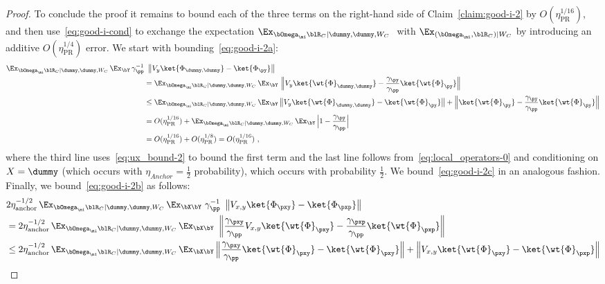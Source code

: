 \begin{proof}
	To conclude the proof  it remains to bound each of the three terms on the right-hand side of Claim~\ref{claim:good-i-2} by $O(\eta_{\text{PR}}^{1/16})$, and then use~\eqref{eq:good-i-cond} to exchange the expectation $ 	\Ex_{\bOmega_{\mi} \blR_C | \dummy,\dummy,W_C} \,\, $ with $ \Ex_{(\bOmega_{\mi}, \blR_C) | W_C}$ by introducing an additive $O(\eta_{\text{PR}}^{1/4})$ error. 
	We start with bounding~\eqref{eq:good-i-2a}:
	\begin{align*}
	\Ex_{\bOmega_{\mi} \blR_C | \dummy,\dummy,W_C} \, \Ex_{\bY} \, \gamma_\pp^{-1} &\,\, \left \|  V_y \ket{{\Phi}_{\dummy,\dummy}} -  \ket{{\Phi}_\py} \right \|  \\
		&=\Ex_{\bOmega_{\mi} \blR_C | \dummy,\dummy,W_C} \, \Ex_{\bY} \,\, \Big \|  V_y \ket{\wt{\Phi}_{\dummy,\dummy}} -  \frac{\gamma_\py}{\gamma_\pp} \ket{\wt{\Phi}_\py} \Big \| \\
		&\leq  \Ex_{\bOmega_{\mi} \blR_C | \dummy,\dummy,W_C} \, \Ex_{\bY} \, \big \|  V_y \ket{\wt{\Phi}_{\dummy,\dummy}} - \ket{\wt{\Phi}_{\py}} \big \| + \Big \| \ket{\wt{\Phi}_{\py}} - \frac{\gamma_{\py}}{\gamma_\pp} \ket{\wt{\Phi}_{\py}}\Big \|\\
		&= O(\eta_{\text{PR}}^{1/16}) + \Ex_{\bOmega_{\mi} \blR_C | \dummy,\dummy,W_C} \, \Ex_{\bY} \, \Big | 1 - \frac{\gamma_{\py}}{\gamma_\pp} \Big | \\
		&= O(\eta_{\text{PR}}^{1/16}) + O(\eta_{\text{PR}}^{1/8}) = O(\eta_{\text{PR}}^{1/16})~,
	\end{align*}
	where the third line uses~\eqref{eq:ux_bound-2} to bound the first term and the last line follows from~\eqref{eq:local_operators-0} and conditioning on $X = \dummy$ (which occurs with $\eta_{Anchor} = \frac{1}{2}$ probability), which occurs with probability $\frac{1}{2}$. We bound~\eqref{eq:good-i-2c} in an analogous fashion. 
	Finally, we bound~\eqref{eq:good-i-2b} as follows:
	\begin{align*}
		&2\eta_{\text{anchor}}^{-1/2}  \, \Ex_{\bOmega_{\mi} \blR_C | \dummy,\dummy,W_C}  \, \Ex_{\bX \bY} \, \, \gamma_\pp^{-1} \,\, \left \|  V_{x,y} \ket{{\Phi}_{\pxy}} -  \ket{{\Phi}_\pxp} \right \| \\
		&= 2\eta_{\text{anchor}}^{-1/2} \,  \Ex_{\bOmega_{\mi} \blR_C | \dummy,\dummy,W_C}  \, \Ex_{\bX \bY} \,\, \left \|  \frac{\gamma_\pxy}{\gamma_\pp} V_{x,y} \ket{\wt{\Phi}_{\pxy}} -  \frac{\gamma_\pxp}{\gamma_\pp} \ket{\wt{\Phi}_\pxp} \right \| \\
		&\leq  2\eta_{\text{anchor}}^{-1/2} \,\Ex_{\bOmega_{\mi} \blR_C | \dummy,\dummy,W_C}  \, \Ex_{\bX \bY} \, \Big \| \frac{\gamma_\pxy}{\gamma_\pp} \ket{\wt{\Phi}_{\pxy}} - \ket{\wt{\Phi}_{\pxy}} \Big \| + \Big \|  V_{x,y} \ket{\wt{\Phi}_{\pxy}} - \ket{\wt{\Phi}_{\pxp}} \Big \|  \\

\end{align*}
\end{proof}
